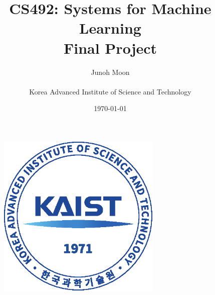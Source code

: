 \documentclass[a4paper,12pt]{article}
\begin{document}
\title{CS492: Systems for Machine Learning\\\large Final Project}
\author{Junoh Moon\\\\Korea Advanced Institute of Science and Technology}
\date{\today}

\begin{figure}[!b]
	\centering
	\includegraphics[width=0.7\textwidth]{./kaist_emblem2.eps}
\end{figure}

\maketitle
\thispagestyle{empty} %
\newpage
\end{document}
